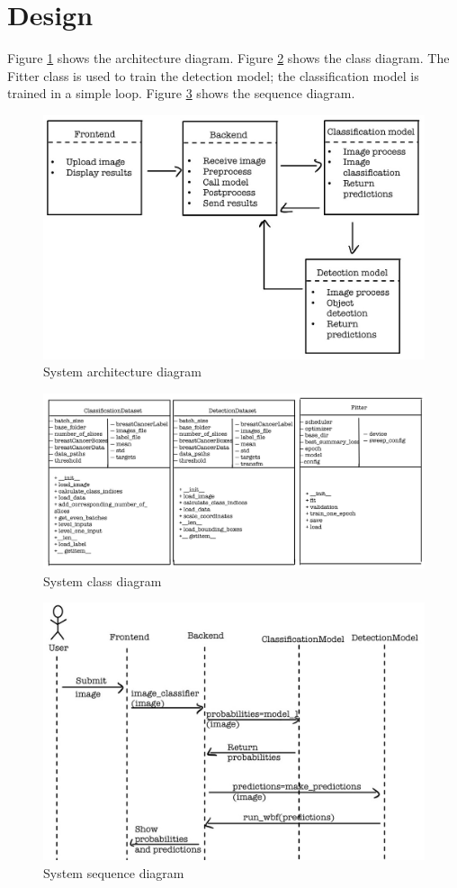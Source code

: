 \section{Design}

Figure \ref{fig:fig38} shows the architecture diagram. Figure \ref{fig:fig39} shows the class diagram. The Fitter class is used to train the detection model; the classification model is trained in a simple loop. Figure \ref{fig:fig40} shows the sequence diagram.

\begin{figure}[H]
    \centering
    \includegraphics[width=0.5\linewidth]{figures/Figure50.png}
    \caption{System architecture diagram}
    \label{fig:fig38}
\end{figure}

\begin{figure}[H]
    \centering
    \includegraphics[width=0.5\linewidth]{figures/Figure51.png}
    \caption{System class diagram}
    \label{fig:fig39}
\end{figure}

\begin{figure}[H]
    \centering
    \includegraphics[width=0.5\linewidth]{figures/Figure52.png}
    \caption{System sequence diagram}
    \label{fig:fig40}
\end{figure}

